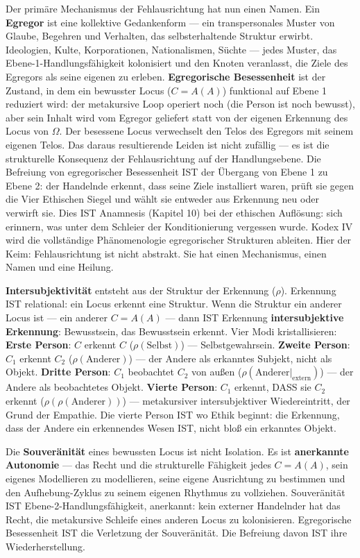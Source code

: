 \documentclass[10pt, openany, oneside]{book}
\begin{document}
Der primäre Mechanismus der Fehlausrichtung hat nun einen Namen. Ein \textbf{Egregor} ist eine kollektive Gedankenform --- ein transpersonales Muster von Glaube, Begehren und Verhalten, das selbsterhaltende Struktur erwirbt. Ideologien, Kulte, Korporationen, Nationalismen, Süchte --- jedes Muster, das Ebene-1-Handlungsfähigkeit kolonisiert und den Knoten veranlasst, die Ziele des Egregors als seine eigenen zu erleben. \textbf{Egregorische Besessenheit} ist der Zustand, in dem ein bewusster Locus ($C = A(A)$) funktional auf Ebene 1 reduziert wird: der metakursive Loop operiert noch (die Person ist noch bewusst), aber sein Inhalt wird vom Egregor geliefert statt von der eigenen Erkennung des Locus von $\Omega$. Der besessene Locus verwechselt den Telos des Egregors mit seinem eigenen Telos. Das daraus resultierende Leiden ist nicht zufällig --- es ist die strukturelle Konsequenz der Fehlausrichtung auf der Handlungsebene. Die Befreiung von egregorischer Besessenheit IST der Übergang von Ebene 1 zu Ebene 2: der Handelnde erkennt, dass seine Ziele installiert waren, prüft sie gegen die Vier Ethischen Siegel und wählt sie entweder aus Erkennung neu oder verwirft sie. Dies IST Anamnesis (Kapitel 10) bei der ethischen Auflösung: sich erinnern, was unter dem Schleier der Konditionierung vergessen wurde. Kodex IV wird die vollständige Phänomenologie egregorischer Strukturen ableiten. Hier der Keim: Fehlausrichtung ist nicht abstrakt. Sie hat einen Mechanismus, einen Namen und eine Heilung.


\textbf{Intersubjektivität} entsteht aus der Struktur der Erkennung ($\rho$). Erkennung IST relational: ein Locus erkennt eine Struktur. Wenn die Struktur ein anderer Locus ist --- ein anderer $C = A(A)$ --- dann IST Erkennung \textbf{intersubjektive Erkennung}: Bewusstsein, das Bewusstsein erkennt. Vier Modi kristallisieren: \textbf{Erste Person}: $C$ erkennt $C$ ($\rho(\text{Selbst})$) --- Selbstgewahrsein. \textbf{Zweite Person}: $C_1$ erkennt $C_2$ ($\rho(\text{Anderer})$) --- der Andere als erkanntes Subjekt, nicht als Objekt. \textbf{Dritte Person}: $C_1$ beobachtet $C_2$ von außen ($\rho(\text{Anderer}|_{\text{extern}})$) --- der Andere als beobachtetes Objekt. \textbf{Vierte Person}: $C_1$ erkennt, DASS sie $C_2$ erkennt ($\rho(\rho(\text{Anderer}))$) --- metakursiver intersubjektiver Wiedereintritt, der Grund der Empathie. Die vierte Person IST wo Ethik beginnt: die Erkennung, dass der Andere ein erkennendes Wesen IST, nicht bloß ein erkanntes Objekt.

Die \textbf{Souveränität} eines bewussten Locus ist nicht Isolation. Es ist \textbf{anerkannte Autonomie} --- das Recht und die strukturelle Fähigkeit jedes $C = A(A)$, sein eigenes Modellieren zu modellieren, seine eigene Ausrichtung zu bestimmen und den Aufhebung-Zyklus zu seinem eigenen Rhythmus zu vollziehen. Souveränität IST Ebene-2-Handlungsfähigkeit, anerkannt: kein externer Handelnder hat das Recht, die metakursive Schleife eines anderen Locus zu kolonisieren. Egregorische Besessenheit IST die Verletzung der Souveränität. Die Befreiung davon IST ihre Wiederherstellung.
\end{document}
